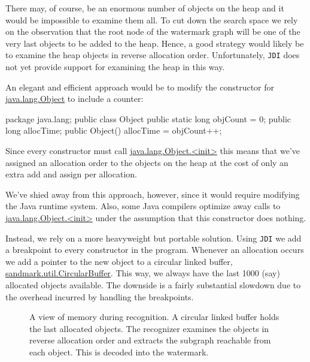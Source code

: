 There may, of course, be an enormous number of objects on
the heap and it would be impossible to examine them all.
To cut down the search space we rely on the observation
that the root node of the watermark graph will be one
of the very last objects to be added to the heap. Hence,
a good strategy would likely be to examine the heap objects 
in reverse allocation order. Unfortunately, {\tt JDI} 
does not yet provide support for examining the heap
in this way. 

An elegant and efficient approach would be to modify
the constructor for \url{java.lang.Object} to include
a counter:
\begin{listing}{1}
package java.lang;
public class Object {
    public static long objCount = 0;                      
    public long allocTime;                                
    public Object() {allocTime = objCount++;} 
}
\end{listing}
Since every constructor must call \url{java.lang.Object.<init>}
this means that we've assigned an allocation order to
the objects on the heap at the cost of only an extra add and 
assign per allocation.

We've shied away from this approach, however, since it would
require modifying the Java runtime system. Also, some Java
compilers optimize away calls to \url{java.lang.Object.<init>}
under the assumption that this constructor does nothing.

Instead, we rely on a more heavyweight but portable solution.
Using {\tt JDI} we add a breakpoint to every constructor
in the program. Whenever an allocation occurs we add a
pointer to the new object to a circular linked buffer,
\url{sandmark.util.CircularBuffer}. This way, we always
have the last 1000 (say) allocated objects available.
The downside is a fairly substantial slowdown due to the 
overhead incurred by handling the breakpoints.

\begin{figure}
\begin{center}

\end{center}
\caption{A view of memory during recognition. A circular linked
         buffer holds the last allocated objects. The recognizer
         examines the objects in reverse allocation order and extracts
         the subgraph reachable from each object. This is
         decoded into the watermark.}
\label{CTexample2}
\end{figure}

